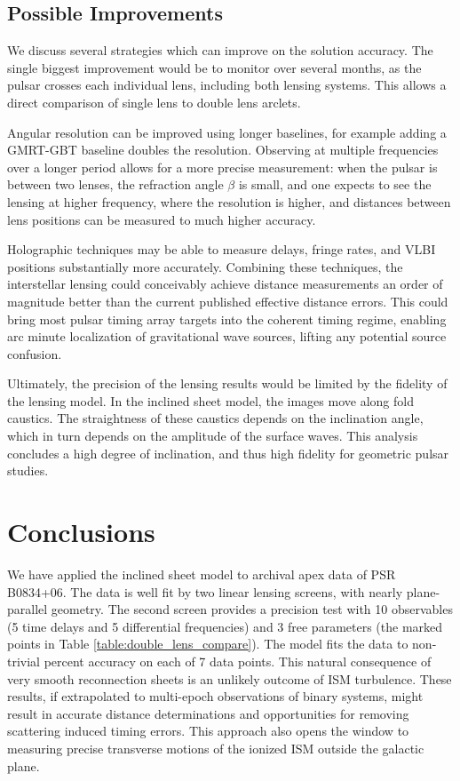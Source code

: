 \documentclass[useAMS,usenatbib]{mn2e}
\begin{document}
\subsection{Possible Improvements}

We discuss several strategies which can improve on the solution
accuracy.  The single biggest improvement would be to monitor over
several months, as the pulsar crosses each individual lens,
including both lensing systems.  This allows a direct comparison of
single lens to double lens arclets.

Angular resolution can be improved using longer baselines, for example
adding a GMRT-GBT baseline doubles the resolution.  Observing at
multiple frequencies over a longer period allows for a more precise
measurement: when the pulsar is between two lenses, the refraction
angle $\beta$ is small, and one expects to see the lensing at higher
frequency, where the resolution is higher, and distances between
lens positions can be measured to much higher accuracy.

Holographic techniques \citep{2008MNRAS.388.1214W,2014MNRAS.440L..36P}
may be able to measure delays, fringe rates, and VLBI positions
substantially more accurately.  Combining these techniques, the
interstellar lensing could conceivably achieve distance measurements
an order of magnitude better than the current published effective
distance errors.  This could bring most pulsar timing array targets
into the coherent timing regime, enabling arc minute localization of
gravitational wave sources, lifting any potential source confusion.

Ultimately, the precision of the lensing results would be limited by
the fidelity of the lensing model.  In the inclined sheet model, the
images move along fold caustics.  The straightness of these caustics
depends on the inclination angle, which in turn depends on the
amplitude of the surface waves.  This analysis concludes a high degree
of inclination, and thus high fidelity for geometric pulsar studies.

\section{Conclusions}

We have applied the inclined sheet model \citep{2014MNRAS.442.3338P} 
to archival apex data of PSR B0834+06.  The data is well fit by two
linear lensing screens, with nearly plane-parallel geometry.  The
second screen provides a precision test with 10 observables (5 time delays and 5 differential frequencies) and 3 free
parameters (the marked points in Table \ref{table:double_lens_compare}).  The model fits the data to non-trivial percent accuracy
on each of 7 data points.  This natural consequence of very smooth
reconnection sheets is an unlikely outcome of ISM turbulence.  These
results, if extrapolated to multi-epoch observations of binary
systems, might result in accurate distance determinations and
opportunities for removing scattering induced timing errors.  This
approach also opens the window to measuring precise transverse motions
of the ionized ISM outside the galactic plane.
\end{document}
